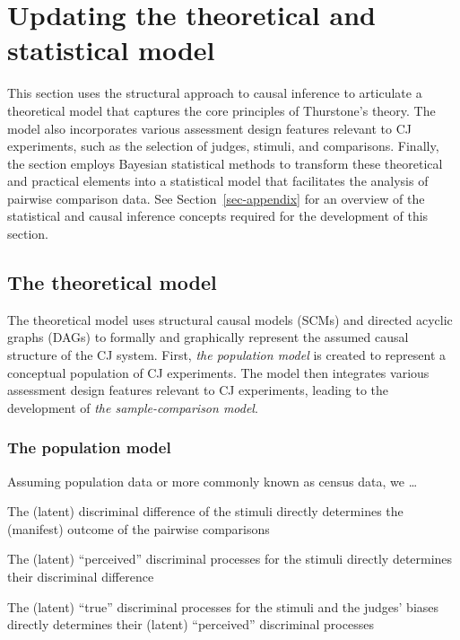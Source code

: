 \documentclass[
  authoryear,
  review,
  1p]{elsarticle}
\begin{document}
\section{Updating the theoretical and statistical
model}\label{sec-theory}

This section uses the structural approach to causal inference
\citep{Pearl_2009, Pearl_et_al_2016} to articulate a theoretical model
that captures the core principles of Thurstone's theory. The model also
incorporates various assessment design features relevant to CJ
experiments, such as the selection of judges, stimuli, and comparisons.
Finally, the section employs Bayesian statistical methods to transform
these theoretical and practical elements into a statistical model that
facilitates the analysis of pairwise comparison data. See
Section~\ref{sec-appendix} for an overview of the statistical and causal
inference concepts required for the development of this section.

\subsection{The theoretical model}\label{sec-theory-theoretical}

The theoretical model uses structural causal models (SCMs) and directed
acyclic graphs (DAGs)
\citep{Pearl_2009, Pearl_et_al_2016, Gross_et_al_2018, Neal_2020} to
formally and graphically represent the assumed causal structure of the
CJ system. First, \emph{the population model} is created to represent a
conceptual population of CJ experiments. The model then integrates
various assessment design features relevant to CJ experiments, leading
to the development of \emph{the sample-comparison model}.

\subsubsection{The population model}\label{sec-theory-theoretical_P}

Assuming population data or more commonly known as census data, we
\ldots{}

The (latent) discriminal difference of the stimuli directly determines
the (manifest) outcome of the pairwise comparisons

The (latent) ``perceived'' discriminal processes for the stimuli
directly determines their discriminal difference

The (latent) ``true'' discriminal processes for the stimuli and the
judges' biases directly determines their (latent) ``perceived''
discriminal processes
\end{document}
